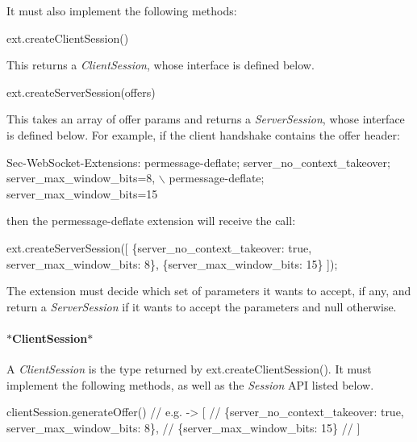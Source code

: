 It must also implement the following methods\+:


\begin{DoxyCode}
ext.createClientSession()
\end{DoxyCode}


This returns a {\itshape Client\+Session}, whose interface is defined below.


\begin{DoxyCode}
ext.createServerSession(offers)
\end{DoxyCode}


This takes an array of offer params and returns a {\itshape Server\+Session}, whose interface is defined below. For example, if the client handshake contains the offer header\+:


\begin{DoxyCode}
Sec-WebSocket-Extensions: permessage-deflate; server\_no\_context\_takeover; server\_max\_window\_bits=8, \(\backslash\)
                          permessage-deflate; server\_max\_window\_bits=15
\end{DoxyCode}


then the {\ttfamily permessage-\/deflate} extension will receive the call\+:


\begin{DoxyCode}
ext.createServerSession([
  \{server\_no\_context\_takeover: true, server\_max\_window\_bits: 8\},
  \{server\_max\_window\_bits: 15\}
]);
\end{DoxyCode}


The extension must decide which set of parameters it wants to accept, if any, and return a {\itshape Server\+Session} if it wants to accept the parameters and {\ttfamily null} otherwise.

\paragraph*{$\ast$\+Client\+Session$\ast$}

A {\itshape Client\+Session} is the type returned by {\ttfamily ext.\+create\+Client\+Session()}. It must implement the following methods, as well as the {\itshape Session} A\+PI listed below.


\begin{DoxyCode}
clientSession.generateOffer()
// e.g.  -> [
//            \{server\_no\_context\_takeover: true, server\_max\_window\_bits: 8\},
//            \{server\_max\_window\_bits: 15\}
//          ]
\end{DoxyCode}



